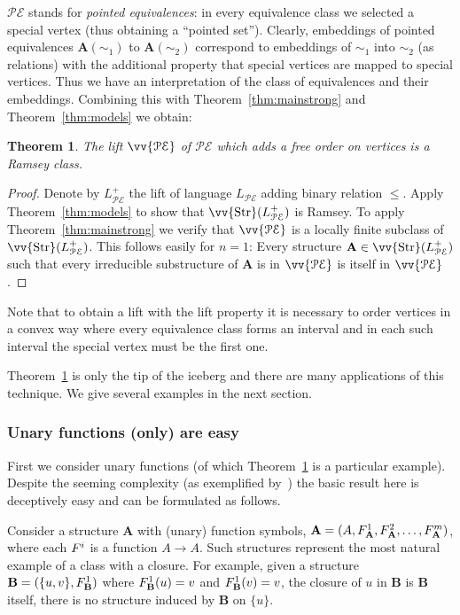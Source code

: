 \documentclass{elsarticle}
\def\Str{\mathop{\mathrm{Str}}\nolimits}
\def\ordclass#1{\vv{#1}}
\def\str#1{\mathbf {#1}}
\def\func#1#2{\nbfunc{\ifstrempty{#1}{}{\str{#1}}}{#2}}
\def\nbfunc#1#2{F\ifstrempty{#1}{}{_{#1}}\ifstrempty{#2}{}{^{#2}}}
\theoremstyle{plain}
\newtheorem{theorem}{Theorem}[section]
\theoremstyle{definition}
\theoremstyle{remark}
\begin{document}
$\mathcal{PE}$ stands for \emph{pointed equivalences}: in every equivalence class we selected a special vertex (thus obtaining a ``pointed set'').
Clearly, embeddings of pointed equivalences $\str{A}(\sim_1)$ to $\str{A}(\sim_2)$ correspond to embeddings of $\sim_1$ into $\sim_2$ (as relations) with the additional property that special vertices are mapped to special vertices. Thus we have an interpretation of the class of equivalences and their embeddings. Combining this with Theorem~\ref{thm:mainstrong} and Theorem~\ref{thm:models} we obtain:
\begin{theorem}
\label{thm:pointed}
The lift $\ordclass{\mathcal{PE}}$ of $\mathcal{PE}$ which adds a free order on vertices is a Ramsey class.
\end{theorem}
\begin{proof}
Denote by $L^+_\mathcal{PE}$ the lift of language $L_\mathcal{PE}$ adding binary relation $\leq$.
Apply Theorem~\ref{thm:models} to show that $\ordclass{\Str}(L^+_\mathcal{PE})$ is Ramsey.
To apply Theorem~\ref{thm:mainstrong} we verify that $\ordclass{\mathcal{PE}}$ is a locally finite subclass of $\ordclass{\Str}(L^+_\mathcal{PE})$.
This follows easily for $n=1$: Every structure $\str{A}\in \ordclass{\Str}(L^+_\mathcal{PE})$ such that every irreducible substructure of $\str{A}$ is in $\ordclass{\mathcal{PE}}$
is itself in $\ordclass{\mathcal{PE}}$.
\end{proof}
Note that to obtain a lift with the lift property it is necessary to order vertices in
a convex way where every equivalence class forms an interval and in each such interval the special vertex must be the first one.

Theorem~\ref{thm:pointed} is only the tip of the iceberg and there are many applications of this technique. We give several examples in the next section.

\subsubsection{Unary functions (only) are easy}
\label{sec:unaryfunctions}

First we consider unary functions (of which Theorem~\ref{thm:pointed} is a particular example).  Despite the seeming complexity (as exemplified
by~\cite{Sokic2016}) the basic result here is deceptively easy and can be formulated
as follows. 

Consider a structure $\str{A}$ with (unary) function symbols, $\str{A}=(A,\func{A}{1}, \func{A}{2},\allowbreak \ldots, \func{A}{m})$,
where each $\func{}{i}$ is a function $A\to A$.
Such structures represent the most natural example of a
class with a closure. For example, given a structure $\str{B}=(\{u,v\},\func{B}{1})$ where $\func{B}{1}(u)=v$ and $\func{B}{1}(v)=v$,
the closure of $u$ in $\str{B}$ is $\str{B}$ itself, there is no structure induced by $\str{B}$ on $\{u\}$.
\end{document}
